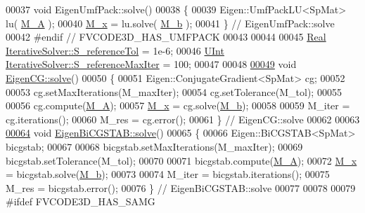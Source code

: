 \begin{DoxyCode}
00037 \textcolor{keywordtype}{void} EigenUmfPack::solve()
00038 \{
00039     Eigen::UmfPackLU<SpMat> lu( \hyperlink{classFVCode3D_1_1Solver_a7a7d556033c96bef473a2dc694af9036}{M\_A} );
00040     \hyperlink{classFVCode3D_1_1Solver_a6414eabf461e95a8fc5b8a49bb06e8cb}{M\_x} = lu.solve( \hyperlink{classFVCode3D_1_1Solver_ac1203c2ea481f5ebd0ce061c1e8073d3}{M\_b} );
00041 \} \textcolor{comment}{// EigenUmfPack::solve}
00042 \textcolor{preprocessor}{#endif // FVCODE3D\_HAS\_UMFPACK}
00043 
00044 
00045 \hyperlink{namespaceFVCode3D_a40c1f5588a248569d80aa5f867080e83}{Real} \hyperlink{classFVCode3D_1_1IterativeSolver_a2afd68f254311907309444138d7f1b89}{IterativeSolver::S\_referenceTol} = 1e-6;
00046 \hyperlink{namespaceFVCode3D_a4bf7e328c75d0fd504050d040ebe9eda}{UInt} \hyperlink{classFVCode3D_1_1IterativeSolver_a938effdbfaa21c23226bfedf904787c2}{IterativeSolver::S\_referenceMaxIter} = 100;
00047 
00048 
\hypertarget{Solver_8cpp_source.tex_l00049}{}\hyperlink{classFVCode3D_1_1EigenCG_a83780a13ba3e3c60e6ad9b587d51ad41}{00049} \textcolor{keywordtype}{void} \hyperlink{classFVCode3D_1_1EigenCG_a83780a13ba3e3c60e6ad9b587d51ad41}{EigenCG::solve}()
00050 \{
00051     Eigen::ConjugateGradient<SpMat> cg;
00052 
00053     cg.setMaxIterations(M\_maxIter);
00054     cg.setTolerance(M\_tol);
00055 
00056     cg.compute(\hyperlink{classFVCode3D_1_1Solver_a7a7d556033c96bef473a2dc694af9036}{M\_A});
00057     \hyperlink{classFVCode3D_1_1Solver_a6414eabf461e95a8fc5b8a49bb06e8cb}{M\_x} = cg.solve(\hyperlink{classFVCode3D_1_1Solver_ac1203c2ea481f5ebd0ce061c1e8073d3}{M\_b});
00058 
00059     M\_iter = cg.iterations();
00060     M\_res = cg.error();
00061 \} \textcolor{comment}{// EigenCG::solve}
00062 
00063 
\hypertarget{Solver_8cpp_source.tex_l00064}{}\hyperlink{classFVCode3D_1_1EigenBiCGSTAB_a8a5ab1bfdbdbb524a8b5a8b9bce8e83d}{00064} \textcolor{keywordtype}{void} \hyperlink{classFVCode3D_1_1EigenBiCGSTAB_a8a5ab1bfdbdbb524a8b5a8b9bce8e83d}{EigenBiCGSTAB::solve}()
00065 \{
00066     Eigen::BiCGSTAB<SpMat> bicgstab;
00067 
00068     bicgstab.setMaxIterations(M\_maxIter);
00069     bicgstab.setTolerance(M\_tol);
00070 
00071     bicgstab.compute(\hyperlink{classFVCode3D_1_1Solver_a7a7d556033c96bef473a2dc694af9036}{M\_A});
00072     \hyperlink{classFVCode3D_1_1Solver_a6414eabf461e95a8fc5b8a49bb06e8cb}{M\_x} = bicgstab.solve(\hyperlink{classFVCode3D_1_1Solver_ac1203c2ea481f5ebd0ce061c1e8073d3}{M\_b});
00073 
00074     M\_iter = bicgstab.iterations();
00075     M\_res = bicgstab.error();
00076 \} \textcolor{comment}{// EigenBiCGSTAB::solve}
00077 
00078 
00079 \textcolor{preprocessor}{#ifdef FVCODE3D\_HAS\_SAMG}

\end{DoxyCode}
